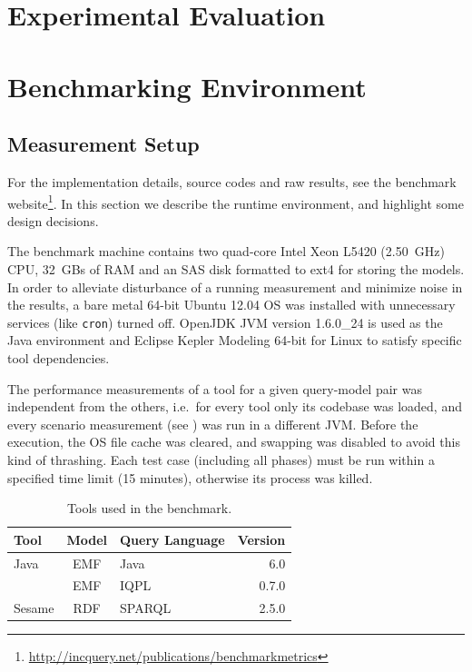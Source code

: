 \section{Experimental Evaluation}
\label{sec:eval}
% 


\section{Benchmarking Environment}
\label{sec:environment}


\subsection{Measurement Setup}

For the implementation details, source codes and raw results, see the benchmark website\footnote{\url{http://incquery.net/publications/benchmarkmetrics}}. In this section we describe the runtime environment, and highlight some design decisions.

The benchmark machine contains two quad-core Intel Xeon L5420 (2.50~GHz) CPU, 32~GBs of RAM and an SAS disk formatted to ext4 for storing the models. In order to alleviate disturbance of a running measurement and minimize noise in the results, a bare metal 64-bit Ubuntu 12.04 OS was installed with unnecessary services (like \texttt{cron}) turned off. OpenJDK JVM version 1.6.0\_24 is used as the Java environment and Eclipse Kepler Modeling 64-bit for Linux to satisfy specific tool dependencies.

The performance measurements of a tool for a given query-model pair was independent from the others, i.e.\ for every tool only its codebase was loaded, and every scenario measurement (see ) was run in a different JVM. Before the execution, the OS file cache was cleared, and swapping was disabled to avoid this kind of thrashing. Each test case (including all phases) must be run within a specified time limit (15 minutes), otherwise its process was killed.

\begin{table}[h]
	\centering
	\footnotesize
	\begin{tabular}{ | l | c | l | r | }
	\hline 
	\textbf{Tool} & \textbf{Model} & \textbf{Query Language} & \textbf{Version} \\ \hline
	Java & EMF & Java & 6.0 \\ \hline
	\incquery{} & EMF & IQPL & 0.7.0 \\ \hline
	Sesame & RDF & SPARQL & 2.5.0 \\ \hline
	\end{tabular}
	\caption{Tools used in the benchmark.}
	\label{tbl:tools-met}
\end{table}

